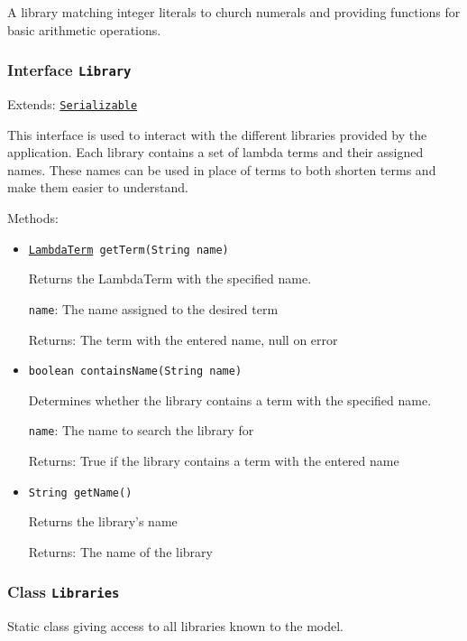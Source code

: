 A library matching integer literals to church numerals
 and providing functions for basic arithmetic operations.

\subsubsection{Interface \texttt{Library}}
\label{type:edu.kit.wavelength.client.model.library.Library}
Extends: \texttt{\hyperref[type:edu.kit.wavelength.client.model.serialization.Serializable]{Serializable}}

This interface is used to interact with the different libraries provided by the application.
 Each library contains a set of lambda terms and their assigned names.
 These names can be used in place of terms to both shorten terms and make them easier to understand.

Methods:
\begin{itemize}
\item \texttt{\hyperref[type:edu.kit.wavelength.client.model.term.LambdaTerm]{LambdaTerm} getTerm(String name)}

Returns the LambdaTerm with the specified name.

\texttt{name}: The name assigned to the desired term

Returns: The term with the entered name, null on error

\item \texttt{boolean containsName(String name)}

Determines whether the library contains a term with the specified name.

\texttt{name}: The name to search the library for

Returns: True if the library contains a term with the entered name

\item \texttt{String getName()}

Returns the library's name

Returns: The name of the library

\end{itemize}

\subsubsection{Class \texttt{Libraries}}
\label{type:edu.kit.wavelength.client.model.library.Libraries}
Static class giving access to all libraries known to the model.


